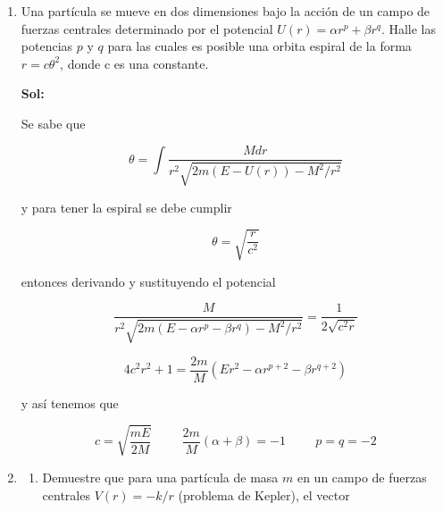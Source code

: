 \documentclass[12pt,a4paper]{article}
\begin{document}
\begin{enumerate}
\begin{enumerate}
\end{enumerate}






\item Una partícula se mueve en dos dimensiones bajo la acción de un campo de fuerzas centrales determinado por el potencial $U(r) = \alpha r^{p} + \beta r^{q}$. Halle las potencias $p$ y $q$ para las cuales es posible una orbita espiral de la forma $r = c \theta^2$, donde c es una constante.

\textbf{Sol:}

Se sabe que

\begin{equation*}
    \theta = \int \frac{M dr}{r^2 \sqrt{2m(E-U(r)) - M^2/r^2}}
\end{equation*}

y para tener la espiral se debe cumplir

\begin{equation*}
    \theta = \sqrt{\frac{r}{c^2}}
\end{equation*}

entonces derivando y sustituyendo el potencial

\begin{equation*}
    \frac{M}{r^2 \sqrt{2m(E - \alpha r^{p} - \beta r^{q} ) - M^2 /r^2}} = \frac{1}{2\sqrt{c^2 r}} 
\end{equation*}

\begin{equation*}
    4 c^2 r^2 + 1 = \frac{2m}{M} (Er^2 - \alpha r^{p +2} - \beta r^{q+2} ) 
\end{equation*}

y así tenemos que

\begin{equation*}
    c = \sqrt{\frac{m E}{2 M}} \hspace{1cm} \frac{2m}{M} (\alpha + \beta) = -1 \hspace{1cm} p = q = -2
\end{equation*}










\item \begin{enumerate}
    \item Demuestre que para una partícula de masa $m$ en un campo de fuerzas centrales $V(r) = -k/r$ (problema de Kepler), el vector
    

\end{enumerate}
\end{enumerate}
\end{document}

